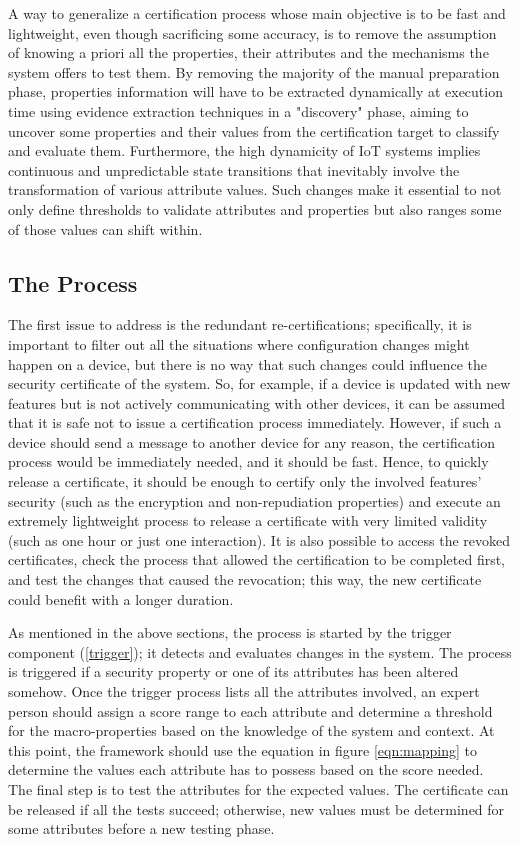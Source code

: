 A way to generalize a certification process whose main objective is to be fast and lightweight, even though sacrificing some accuracy, is to remove the assumption of knowing a priori all the properties, their attributes and the mechanisms the system offers to test them. By removing the majority of the manual preparation phase, properties information will have to be extracted dynamically at execution time using evidence extraction techniques in a "discovery" phase, aiming to uncover some properties and their values from the certification target to classify and evaluate them. Furthermore, the high dynamicity of IoT systems implies continuous and unpredictable state transitions that inevitably involve the transformation of various attribute values. Such changes make it essential to not only define thresholds to validate attributes and properties but also ranges some of those values can shift within.

\subsection{The Process}
The first issue to address is the redundant re-certifications; specifically, it is important to filter out all the situations where configuration changes might happen on a device, but there is no way that such changes could influence the security certificate of the system. So, for example, if a device is updated with new features but is not actively communicating with other devices, it can be assumed that it is safe not to issue a certification process immediately. However, if such a device should send a message to another device for any reason, the certification process would be immediately needed, and it should be fast. Hence, to quickly release a certificate, it should be enough to certify only the involved features' security (such as the encryption and non-repudiation properties) and execute an extremely lightweight process to release a certificate with very limited validity (such as one hour or just one interaction). It is also possible to access the revoked certificates, check the process that allowed the certification to be completed first, and test the changes that caused the revocation; this way, the new certificate could benefit with a longer duration. 

As mentioned in the above sections, the process is started by the trigger component (\ref{trigger}); it detects and evaluates changes in the system. The process is triggered if a security property or one of its attributes has been altered somehow. Once the trigger process lists all the attributes involved, an expert person should assign a score range to each attribute and determine a threshold for the macro-properties based on the knowledge of the system and context. At this point, the framework should use the equation in figure \ref{eqn:mapping} to determine the values each attribute has to possess based on the score needed. The final step is to test the attributes for the expected values. The certificate can be released if all the tests succeed; otherwise, new values must be determined for some attributes before a new testing phase. 

